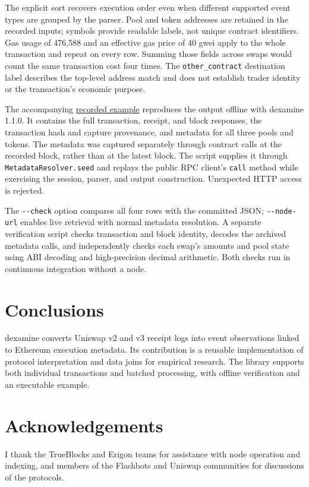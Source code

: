 \documentclass[11pt]{article}
\begin{document}
The explicit sort recovers execution order even when different supported event
types are grouped by the parser. Pool and token addresses are retained in the
recorded inputs; symbols provide readable labels, not unique contract identifiers.
Gas usage of 476,588 and an effective gas price of 40 gwei apply to the whole
transaction and repeat on every row. Summing those fields across swaps would count
the same transaction cost four times. The \texttt{other\_contract} destination label
describes the top-level address match and does not establish trader identity or
the transaction's economic purpose.

The accompanying
\href{https://github.com/HanssonMagnus/dexamine/tree/d030990fa797c4b876bed2b7d474649bcfb1358e/paper/examples}{recorded example}
reproduces the output offline with dexamine 1.1.0. It contains the full transaction,
receipt, and block responses, the transaction hash and capture provenance, and
metadata for all three pools and tokens. The metadata was captured separately
through contract calls at the recorded block, rather than at the latest block.
The script supplies it through \texttt{MetadataResolver.\allowbreak seed} and
replays the public RPC client's \texttt{call} method while exercising the session,
parser, and output construction. Unexpected HTTP access is rejected.

The \verb|--check| option compares all four rows with the committed JSON;
\verb|--node-url| enables live retrieval with normal metadata resolution.
A separate verification script checks transaction and block identity, decodes the
archived metadata calls, and independently checks each swap's amounts and pool
state using ABI decoding and high-precision decimal arithmetic. Both checks run
in continuous integration without a node.

\section{Conclusions}
dexamine converts Uniswap v2 and v3 receipt logs into event observations linked to
Ethereum execution metadata. Its contribution is a reusable implementation of protocol
interpretation and data joins for empirical research. The library supports both
individual transactions and batched processing, with offline verification and an
executable example.

\section*{Acknowledgements}
I thank the TrueBlocks \cite{trueblocks} and Erigon \cite{erigon} teams for assistance with node operation
and indexing, and members of the Flashbots and Uniswap communities for discussions
of the protocols.
\end{document}
